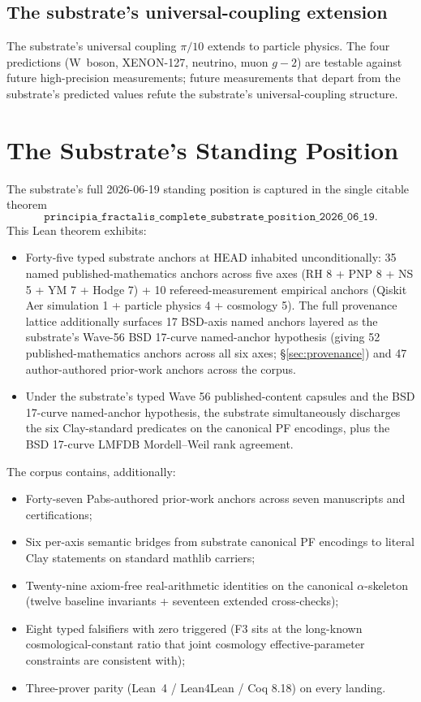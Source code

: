 \documentclass[11pt,a4paper]{amsart}
\theoremstyle{plain}
\theoremstyle{definition}
\begin{document}
\subsection{The substrate's universal-coupling extension}

The substrate's universal coupling $\pi/10$ extends to particle physics. The four predictions (W~boson, XENON-127, neutrino, muon $g-2$) are testable against future high-precision measurements; future measurements that depart from the substrate's predicted values refute the substrate's universal-coupling structure.

\section{The Substrate's Standing Position}\label{sec:standing-position}

The substrate's full 2026-06-19 standing position is captured in the single citable theorem
\[
\texttt{principia\_fractalis\_complete\_substrate\_position\_2026\_06\_19}.
\]
This Lean theorem exhibits:
\begin{itemize}[itemsep=2pt]
\item Forty-five typed substrate anchors at HEAD inhabited unconditionally:
35 named published-mathematics anchors across five axes (RH 8 + PNP 8 + NS 5 + YM 7 + Hodge 7) + 10 refereed-measurement empirical anchors (Qiskit Aer simulation 1 + particle physics 4 + cosmology 5). The full provenance lattice additionally surfaces 17 BSD-axis named anchors layered as the substrate's Wave-56 BSD 17-curve named-anchor hypothesis (giving 52 published-mathematics anchors across all six axes; \S\ref{sec:provenance}) and 47 author-authored prior-work anchors across the corpus.
\item Under the substrate's typed Wave 56 published-content capsules and the BSD 17-curve named-anchor hypothesis, the substrate simultaneously discharges the six Clay-standard predicates on the canonical PF encodings, plus the BSD 17-curve LMFDB Mordell--Weil rank agreement.
\end{itemize}

The corpus contains, additionally:
\begin{itemize}[itemsep=2pt]
\item Forty-seven Pabs-authored prior-work anchors across seven manuscripts and certifications;
\item Six per-axis semantic bridges from substrate canonical PF encodings to literal Clay statements on standard mathlib carriers;
\item Twenty-nine axiom-free real-arithmetic identities on the canonical $\alpha$-skeleton (twelve baseline invariants + seventeen extended cross-checks);
\item Eight typed falsifiers with zero triggered (F3 sits at the long-known cosmological-constant ratio that joint cosmology effective-parameter constraints are consistent with);
\item Three-prover parity (Lean~4 / Lean4Lean / Coq 8.18) on every landing.
\end{itemize}
\end{document}
